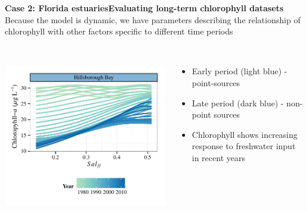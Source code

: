 \documentclass[serif]{beamer}\usepackage[]{graphicx}\usepackage[]{color}
\makeatletter
\def\maxwidth{ %
  \ifdim\Gin@nat@width>\linewidth
    \linewidth
  \else
    \Gin@nat@width
  \fi
}
\makeatother
\begin{document}
\begin{frame}{\textbf{Case 2: Florida estuaries}}{\textbf{Evaluating long-term chlorophyll datasets}}
Because the model is dynamic, we have parameters describing the relationship of chlorophyll with other factors specific to different time periods \\~\\
\begin{columns}[T]
\begin{column}{0.45\textwidth}


{\centering \includegraphics[width=\maxwidth]{fig/hill-1} 

}



\end{column}
\begin{column}{0.45\textwidth}
\begin{itemize}
\item Early period (light blue) - point-sources
\item Late period (dark blue) - non-point sources
\item Chlorophyll shows increasing response to freshwater input in recent years
\end{itemize}
\end{column}
\end{columns}
\end{frame}
\end{document}

